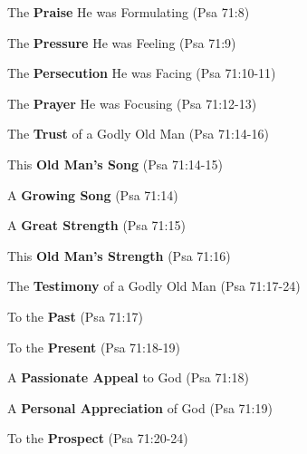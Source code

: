 \begin{compactenum}[I.][7]
\begin{compactenum}[A.]
    		\item The \textbf{Praise} He was Formulating (Psa 71:8)
    		\item The \textbf{Pressure} He was Feeling (Psa 71:9)
    		\item The \textbf{Persecution} He was Facing (Psa 71:10-11)
    		\item The \textbf{Prayer} He was Focusing (Psa 71:12-13)
    \end{compactenum}
    \item The \textbf{Trust} of a Godly Old Man (Psa 71:14-16)
    \begin{compactenum}[A.]
    		\item This \textbf{Old Man's Song}  (Psa 71:14-15)
    		\begin{compactenum}[1.]
    			\item A \textbf{Growing Song}  (Psa 71:14)
    			\item A \textbf{Great Strength}  (Psa 71:15)
		\end{compactenum}
    		\item This \textbf{Old Man's Strength}  (Psa 71:16)
    \end{compactenum}
    \item The \textbf{Testimony} of a Godly Old Man (Psa 71:17-24)
    \begin{compactenum}[A.]
    		\item To the \textbf{Past}  (Psa 71:17)
    		\item To the \textbf{Present}  (Psa 71:18-19)
		\begin{compactenum}[1.]
    			\item A \textbf{Passionate Appeal} to God (Psa 71:18)
    			\item A \textbf{Personal Appreciation} of God (Psa 71:19)
    		\end{compactenum}
    		\item To the \textbf{Prospect}  (Psa 71:20-24)
    		\begin{compactenum}[1.]

\end{compactenum}
\end{compactenum}
\end{compactenum}
